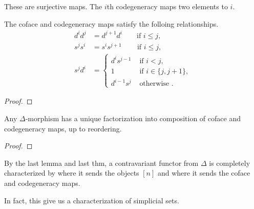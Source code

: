 These are surjective maps.
The \(i\)th codegeneracy maps two elements to \(i\).

\begin{theorem}
    The coface and codegeneracy maps satisfy the folloing relationships.
    \begin{align*}
        d^id^j &= d^{j+1} d^i       \qquad\text{if } i\leq j,\\
        s^{j}s^i &= s^i s^{j+1}     \qquad\,\text{if } i\leq j,\\
        s^jd^i &= \begin{cases}
            d^i s^{j-1} &\text{ if } i <j, \\
            1 & \text{ if } i\in \{j,j+1\}, \\
            d^{i-1} s^j & \text{ otherwise }.
        \end{cases}
    \end{align*}
\end{theorem}
\begin{proof}
    
\end{proof}

\begin{lemma}
    Any \(\Delta\)-morphism has a unique factorization into composition of coface and codegeneracy maps, up to reordering.
\end{lemma}
\begin{proof}
    
\end{proof}

By the last lemma and last thm, a contravariant functor from \(\Delta\) is completely characterized by where it sends the objects  \([n]\)   and where it sends the coface and codegeneracy maps.

In fact, this give us a characterization of simplicial sets.

